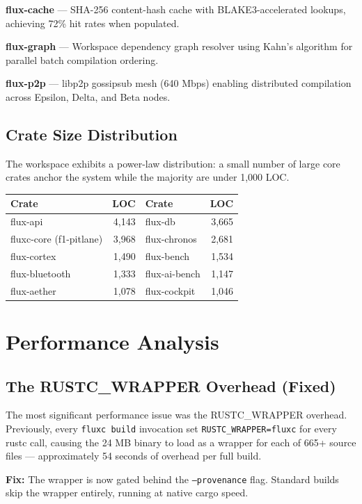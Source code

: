 \documentclass[11pt,a4paper]{article}
\begin{document}
\textbf{flux-cache} — SHA-256 content-hash cache with BLAKE3-accelerated lookups, achieving 72\% hit rates when populated.

\textbf{flux-graph} — Workspace dependency graph resolver using Kahn's algorithm for parallel batch compilation ordering.

\textbf{flux-p2p} — libp2p gossipsub mesh (640 Mbps) enabling distributed compilation across Epsilon, Delta, and Beta nodes.

\subsection{Crate Size Distribution}

The workspace exhibits a power-law distribution: a small number of large core crates anchor the system while the majority are under 1,000 LOC.

\begin{center}
\begin{tabular}{lrlr}
\toprule
\textbf{Crate} & \textbf{LOC} & \textbf{Crate} & \textbf{LOC} \\
\midrule
flux-api & 4,143 & flux-db & 3,665 \\
fluxc-core (f1-pitlane) & 3,968 & flux-chronos & 2,681 \\
flux-cortex & 1,490 & flux-bench & 1,534 \\
flux-bluetooth & 1,333 & flux-ai-bench & 1,147 \\
flux-aether & 1,078 & flux-cockpit & 1,046 \\
\bottomrule
\end{tabular}
\end{center}

\section{Performance Analysis}

\subsection{The RUSTC\_WRAPPER Overhead (Fixed)}

The most significant performance issue was the RUSTC\_WRAPPER overhead. Previously, every \texttt{fluxc build} invocation set \texttt{RUSTC\_WRAPPER=fluxc} for every rustc call, causing the 24 MB binary to load as a wrapper for each of 665+ source files — approximately 54 seconds of overhead per full build.

\textbf{Fix:} The wrapper is now gated behind the \texttt{--provenance} flag. Standard builds skip the wrapper entirely, running at native cargo speed.
\end{document}
